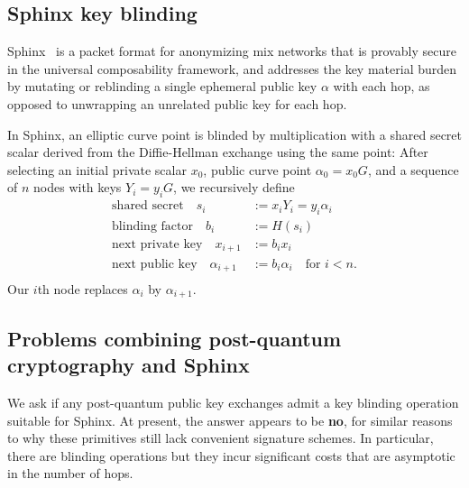 \documentclass[twoside,letterpaper]{llncs}
\def\mathcomma{}
\begin{document}

\subsection{Sphinx key blinding}


Sphinx~\cite{Sphinx} is a packet format for anonymizing mix networks
that is provably secure in the universal composability framework, and
 addresses the key material burden by mutating or reblinding a
 single ephemeral public key $\alpha$ with each hop,
 as opposed to unwrapping an unrelated public key for each hop.

In Sphinx, an elliptic curve point is blinded by multiplication with
a shared secret scalar derived from the Diffie-Hellman exchange using
the same point:
After selecting an initial private scalar $x_0$,
 public curve point $\alpha_0 = x_0 G$, and 
 a sequence of $n$ nodes with keys $Y_i = y_i G$,
we recursively define 
\[ \begin{aligned}
\textrm{shared secret}\quad
 s_i &:= x_i Y_i = y_i \alpha_i \mathcomma \\
\textrm{blinding factor}\quad
 b_i &:= H(s_i) \mathcomma \\
\textrm{next private key}\quad
 x_{i+1} &:= b_i x_i \mathcomma \\ %
\textrm{next public key}\quad
 \alpha_{i+1} &:= b_i \alpha_i \quad\textrm{for $i < n$.} \\
\end{aligned} \]
Our $i$th node replaces $\alpha_i$ by $\alpha_{i+1}$.


\subsection{Problems combining post-quantum cryptography and Sphinx}

We ask if any post-quantum public key exchanges admit 
a key blinding operation suitable for Sphinx. 
At present, the answer appears to be {\bf no}, for similar reasons to
why these primitives still lack convenient signature schemes. 
In particular, there are blinding operations but they incur significant
costs  that are asymptotic in the number of hops.
\end{document}
